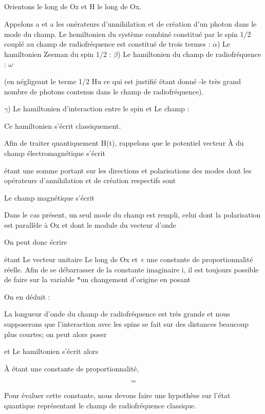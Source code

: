 \subsection{}%

Orientons  le long de Oz et H le long de Ox.

Appelons a et a les onérateurs d'unnihilation et de création d'un
photon dans le mode du champ. Le hemiltonien du système combiné constitué par
le spin 1/2 couplé au champ de radiofréquence est constitué de trois termes :
$\alpha$) Le hamiltonien Zeeman du spin 1/2 :
$\beta$) Le hamiltonien du champ de radiofréquence : $\omega$

(en négligeant le terme 1/2 Hu ce qui est justifié étant donné -le très grand
nombre de photons contenus dans le champ de radiofréquence).

$\gamma$) Le hamiltonien d'interaction entre le spin et Le champ : 

Ce hamiltonien s'écrit classiquement.


Afin de traiter quantiquement H(t), rappelons que le potentiel
vecteur À du champ électromagnétique s'écrit

étant une somme portant sur les directions et polarisations des modes
dont les opérateurs d'annihilation et de création respectifs sont

Le champ magnétique  s'écrit

Dans le cas présent, un seul mode du champ est rempli, celui dont la polarisation
est parallèle à Ox et dont le module du vecteur d'onde

On peut donc écrire

étant Le vecteur unitaire Le long de Ox et « une constante de proportionnalité
réelle. Afin de se débarrasser de la constante imaginaire i, il est toujours
possible de faire sur la variable *un changement d'origine en posant

On en déduit :

La longueur d'onde du champ de radiofréquence est très grande et nous supposerons
que l'interaction avec les spins se fait sur des distances beaucoup plus courtes;
 on peut alors poser 

et 
Le hamiltonien  s'écrit alors

À étant une constante de proportionnalité,


\[
\tag{49}=
\]

Pour évaluer cette constante, nous devons faire une hypothèse sur
l'état quantique représentant le champ de radiofréquence classique.

